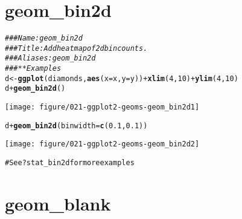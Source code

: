 \documentclass[a4paper,titlepage]{tufte-handout}\usepackage[]{graphicx}\usepackage[]{color}
\makeatletter
\def\maxwidth{ %
  \ifdim\Gin@nat@width>\linewidth
    \linewidth
  \else
    \Gin@nat@width
  \fi
}
\newcommand{\hlnum}[1]{\textcolor[rgb]{0.686,0.059,0.569}{#1}}%
\newcommand{\hlcom}[1]{\textcolor[rgb]{0.678,0.584,0.686}{\textit{#1}}}%
\newcommand{\hlopt}[1]{\textcolor[rgb]{0,0,0}{#1}}%
\newcommand{\hlstd}[1]{\textcolor[rgb]{0.345,0.345,0.345}{#1}}%
\newcommand{\hlkwb}[1]{\textcolor[rgb]{0.69,0.353,0.396}{#1}}%
\newcommand{\hlkwc}[1]{\textcolor[rgb]{0.333,0.667,0.333}{#1}}%
\newcommand{\hlkwd}[1]{\textcolor[rgb]{0.737,0.353,0.396}{\textbf{#1}}}%
\newenvironment{kframe}{%
 \def\at@end@of@kframe{}%
 \ifinner\ifhmode%
  \def\at@end@of@kframe{\end{minipage}}%
  \begin{minipage}{\columnwidth}%
 \fi\fi%
 \def\FrameCommand##1{\hskip\@totalleftmargin \hskip-\fboxsep
 \colorbox{shadecolor}{##1}\hskip-\fboxsep
     \hskip-\linewidth \hskip-\@totalleftmargin \hskip\columnwidth}%
 \MakeFramed {\advance\hsize-\width
   \@totalleftmargin\z@ \linewidth\hsize
   \@setminipage}}%
 {\par\unskip\endMakeFramed%
 \at@end@of@kframe}
\newenvironment{knitrout}{}{} %
\makeatother
\begin{document}
\section{geom\_bin2d}

\begin{knitrout}
\color{fgcolor}\begin{kframe}
\begin{alltt}
\hlcom{### Name: geom_bin2d}
\hlcom{### Title: Add heatmap of 2d bin counts.}
\hlcom{### Aliases: geom_bin2d}
\hlcom{### ** Examples}
\hlstd{d} \hlkwb{<-} \hlkwd{ggplot}\hlstd{(diamonds,} \hlkwd{aes}\hlstd{(}\hlkwc{x} \hlstd{= x,} \hlkwc{y} \hlstd{= y))} \hlopt{+} \hlkwd{xlim}\hlstd{(}\hlnum{4}\hlstd{,}\hlnum{10}\hlstd{)} \hlopt{+} \hlkwd{ylim}\hlstd{(}\hlnum{4}\hlstd{,}\hlnum{10}\hlstd{)}
\hlstd{d} \hlopt{+} \hlkwd{geom_bin2d}\hlstd{()}
\end{alltt}
\end{kframe}
\texttt{[image: figure/021-ggplot2-geoms-geom\_bin2d1]} 
\begin{kframe}\begin{alltt}
\hlstd{d} \hlopt{+} \hlkwd{geom_bin2d}\hlstd{(}\hlkwc{binwidth} \hlstd{=} \hlkwd{c}\hlstd{(}\hlnum{0.1}\hlstd{,} \hlnum{0.1}\hlstd{))}
\end{alltt}
\end{kframe}
\texttt{[image: figure/021-ggplot2-geoms-geom\_bin2d2]} 
\begin{kframe}\begin{alltt}

# See ?stat_bin2d for more examples


\end{alltt}
\end{kframe}
\end{knitrout}



\section{geom\_blank}
\end{document}
